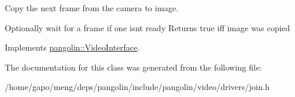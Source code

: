 Copy the next frame from the camera to image. 

Optionally wait for a frame if one isn\textquotesingle{}t ready Returns true iff image was copied 

Implements \hyperlink{structpangolin_1_1_video_interface_a2a87c2219959a762dbbb43760d27ff27}{pangolin\+::\+Video\+Interface}.



The documentation for this class was generated from the following file\+:\begin{DoxyCompactItemize}
\item 
/home/gapo/meng/deps/pangolin/include/pangolin/video/drivers/join.\+h\end{DoxyCompactItemize}
